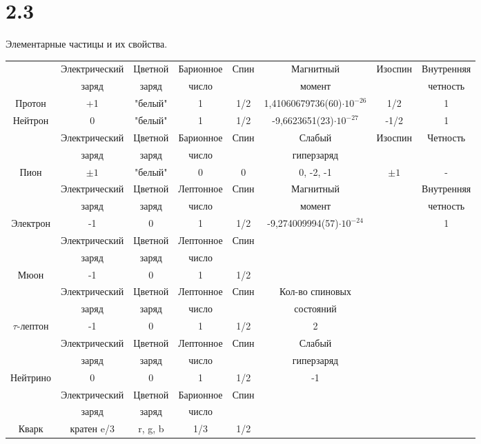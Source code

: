 \documentclass[a4paper,14pt]{article}
\begin{document}
\section*{2.3}
\begin{center}
	Элементарные частицы и их свойства. \\
\end{center}
\begin{scriptsize}
\begin{center}
\begin{tabular}{cccccccc}
\hline
& Электрический & Цветной & Барионное& Спин & Магнитный  & Изоспин & Внутренняя\\
& заряд &заряд& число & & момент  && четность\\
Протон & +1 &"белый"& 1 &  1/2 & 1,41060679736(60)$\cdot10^{-26}$  & 1/2& 1\\
Нейтрон & 0 &"белый"& 1 &  1/2 & -9,6623651(23)$\cdot10^{-27}$ & -1/2& 1\\
\hline
& Электрический &Цветной& Барионное& Спин & Слабый & Изоспин& Четность\\
& заряд &заряд& число & & гиперзаряд && \\
Пион &$\pm1$ & "белый"&0&0&0, -2, -1&$\pm1$& -
\\
\hline
& Электрический &Цветной& Лептонное & Спин & Магнитный && Внутренняя   \\
& заряд &заряд& число & & момент && четность\\
Электрон & -1 &0 & 1 & 1/2 & -9,274009994(57)$\cdot10^{-24}$ && 1
\\
\hline
& Электрический &Цветной& Лептонное & Спин &&& \\
& заряд & заряд & число &&&&  \\
Мюон & -1 &0& 1 & 1/2 &&&
\\
\hline
& Электрический &Цветной& Лептонное & Спин & Кол-во спиновых   \\
& заряд &заряд& число & & состояний \\
$\tau$-лептон & -1 &0& 1 & 1/2 & 2
\\
\hline
& Электрический &Цветной& Лептонное & Спин & Слабый  \\
& заряд &заряд& число & & гиперзаряд \\
Нейтрино & 0 & 0 & 1 & 1/2 & -1
\\
\hline
& Электрический &Цветной& Барионное & Спин  \\
& заряд &заряд& число & \\
Кварк & кратен e/3 & r, g, b & 1/3 & 1/2 
\\

\end{tabular}
\end{center}
\end{scriptsize}
\end{document}
